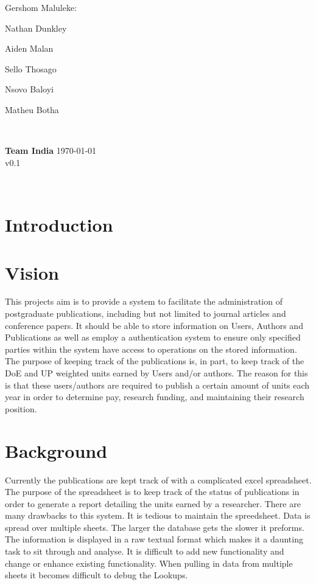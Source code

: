 \documentclass{article}
\newcommand{\tab}[1]{\hspace{.1\textwidth}\rlap{#1}}
\begin{document}
\begin{titlepage}
\begin{minipage}{0.5\textwidth}
\begin{flushleft}
	Gershom Maluleke:\tab{13229908}


	Nathan Dunkley

	Aiden Malan

	Sello Thosago

	Nsovo Baloyi

	Matheu Botha 
	\end{flushleft}
	\end{minipage}
	~
	\begin{minipage}{0.4\textwidth}
	\begin{flushright} \large
	{ \huge \bfseries Team India }%
	{\large \today}\\
	{\large v0.1}
	\end{flushright}
	\end{minipage}\\[4cm]
\end{titlepage}


	\newpage
	
	\section{Introduction}
	

	\section{Vision}

	This projects aim is to provide a system to facilitate the administration of postgraduate publications, including but not limited to journal articles and conference papers. It should be able to store information on Users, Authors and Publications as well as employ a authentication system to ensure only specified parties within the system have access to operations on the stored information.
	The purpose of keeping track of the publications is, in part, to keep track of the DoE and UP weighted units earned by Users and/or authors. The reason for this is that these users/authors are required to publish a certain amount of units each year in order to determine pay, research funding, and maintaining their research position.

	\section{Background}
	Currently the publications are kept track of with a complicated excel spreadsheet. The purpose of the spreadsheet is to keep track of the status of publications in order to generate a report detailing the units earned by a researcher. There are many drawbacks to this system. It is tedious to maintain the spreedsheet. Data is spread over multiple sheets. The larger the database gets the slower it preforms. The information is displayed in a raw textual format which makes it a daunting task to sit through and analyse. It is difficult to add new functionality and change or enhance existing functionality. When pulling in data from multiple sheets it becomes difficult to debug the Lookups.
\end{document}
